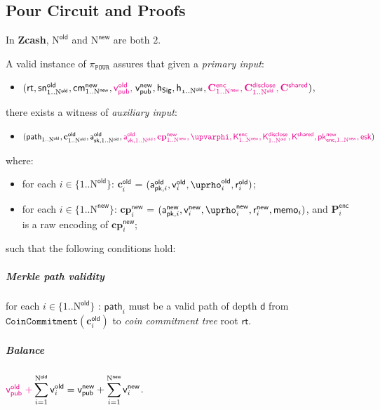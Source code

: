 \documentclass{article}
\newcommand{\changedcolor}{magenta}
\newcommand{\setchanged}{\color{\changedcolor}}
\newcommand{\changed}[1]{{\setchanged{#1}}}
\newcommand{\term}[1]{\textsl{#1}\xspace}
\newcommand{\termbf}[1]{\textbf{#1}\xspace}
\newcommand{\Zcash}{\termbf{Zcash}}
\newcommand{\coinCommitmentTree}{\term{coin commitment tree}}
\newcommand{\AuthPublicOld}[1]{\mathsf{a^{old}_{pk,\mathnormal{#1}}}}
\newcommand{\DiscloseKeyOld}[1]{\mathsf{a^{old}_{vk,\mathnormal{#1}}}}
\newcommand{\AuthPrivateOld}[1]{\mathsf{a^{old}_{sk,\mathnormal{#1}}}}
\newcommand{\AuthPublicNew}[1]{\mathsf{a^{new}_{pk,\mathnormal{#1}}}}
\newcommand{\enc}{\mathsf{enc}}
\newcommand{\disclose}{\mathsf{disclose}}
\newcommand{\shared}{\mathsf{shared}}
\newcommand{\EphemeralPrivate}{\mathsf{esk}}
\newcommand{\TransmitPublicNew}[1]{\mathsf{pk^{new}_{\enc,\mathnormal{#1}}}}
\newcommand{\CoinCommitRandOld}[1]{\mathsf{r^{old}_\mathnormal{#1}}}
\newcommand{\CoinCommitRandNew}[1]{\mathsf{r^{new}_\mathnormal{#1}}}
\newcommand{\CoinAddressRandOld}[1]{\mathsf{\uprho^{old}_\mathnormal{#1}}}
\newcommand{\CoinAddressRandNew}[1]{\mathsf{\uprho^{new}_\mathnormal{#1}}}
\newcommand{\CoinAddressPreRand}{\mathsf{\upvarphi}}
\newcommand{\Memo}{\mathsf{memo}}
\newcommand{\Plaintext}{\mathbf{P}}
\newcommand{\Ciphertext}{\mathbf{C}}
\newcommand{\Key}{\mathsf{K}}
\newcommand{\TransmitPlaintext}[1]{\Plaintext^\enc_{#1}}
\newcommand{\TransmitCiphertext}[1]{\Ciphertext^\enc_{#1}}
\newcommand{\TransmitKey}[1]{\Key^\enc_{#1}}
\newcommand{\DerivedKey}[1]{\Key^\disclose_{#1}}
\newcommand{\DiscloseCiphertext}[1]{\Ciphertext^\disclose_{#1}}
\newcommand{\SharedCiphertext}{\Ciphertext^\shared}
\newcommand{\SharedKey}[1]{\Key^\shared_{#1}}
\newcommand{\cmNew}[1]{\mathsf{{cm}^{new}_\mathnormal{#1}}}
\newcommand{\MerkleDepth}{\mathsf{d}}
\newcommand{\snOld}[1]{\mathsf{{sn}^{old}_\mathnormal{#1}}}
\newcommand{\vsum}[2]{\smashoperator[r]{\sum_{#1}^{#2}}}
\newcommand{\rt}{\mathsf{rt}}
\newcommand{\hSig}{\mathsf{h_{Sig}}}
\newcommand{\h}[1]{\mathsf{h_{\mathnormal{#1}}}}
\newcommand{\NOld}{\mathrm{N}^\mathsf{old}}
\newcommand{\NNew}{\mathrm{N}^\mathsf{new}}
\newcommand{\PourStatement}{\texttt{POUR}}
\newcommand{\PourProof}{\pi_{\PourStatement}}
\newcommand{\vpubOld}{\mathsf{v_{pub}^{old}}}
\newcommand{\vpubNew}{\mathsf{v_{pub}^{new}}}
\newcommand{\cOld}[1]{\mathbf{c}_{#1}^\mathsf{old}}
\newcommand{\cpNew}[1]{\mathbf{cp}_{#1}^\mathsf{new}}
\newcommand{\vOld}[1]{\mathsf{v}_{#1}^\mathsf{old}}
\newcommand{\vNew}[1]{\mathsf{v}_{#1}^\mathsf{new}}
\newcommand{\treepath}[1]{\mathsf{path}_{#1}}
\newcommand{\CoinCommitment}{\mathtt{CoinCommitment}}
\begin{document}
\subsection{Pour Circuit and Proofs}

In \Zcash, $\NOld$ and $\NNew$ are both $2$.

A valid instance of $\PourProof$ assures that given a \term{primary input}:

\begin{itemize}
  \item[] $(\rt, \snOld{\mathrm{1}..\NOld}, \cmNew{\mathrm{1}..\NNew}, \changed{\vpubOld,\;}
\vpubNew, \hSig, \h{1..\NOld}, \changed{\TransmitCiphertext{1..\NNew},
\DiscloseCiphertext{1..\NOld}, \SharedCiphertext})$,
\end{itemize}

there exists a witness of \term{auxiliary input}:

\begin{itemize}
  \item[] $(\treepath{1..\NOld}, \cOld{1..\NOld}, \AuthPrivateOld{\mathrm{1}..\NOld},
\changed{\DiscloseKeyOld{\mathrm{1}..\NOld}, \cpNew{1..\NNew},
\CoinAddressPreRand, \TransmitKey{1..\NNew}, \DerivedKey{1..\NOld}, \SharedKey{},
\TransmitPublicNew{\mathrm{1}..\NNew}, \EphemeralPrivate})$
\end{itemize}

where:

\begin{itemize}
  \item[] for each $i \in \{1..\NOld\}$: $\cOld{i}$ = $(\AuthPublicOld{i},
\vOld{i}, \CoinAddressRandOld{i}, \CoinCommitRandOld{i})$;
  \item[] for each $i \in \{1..\NNew\}$: $\cpNew{i}$ = $(\AuthPublicNew{i},
\vNew{i}, \CoinAddressRandNew{i}, \CoinCommitRandNew{i}, \Memo_i)$,
and $\TransmitPlaintext{i}$ is a raw encoding of $\cpNew{i}$;
\end{itemize}

such that the following conditions hold:

\subparagraph{Merkle path validity}

for each $i \in \{1..\NOld\}$ \changed{$\mid$ $\vOld{i} \neq 0$}:
$\treepath{i}$ must be a valid path of depth $\MerkleDepth$ from \linebreak
$\CoinCommitment(\cOld{i})$ to \coinCommitmentTree root $\rt$.

\subparagraph{Balance}

$\changed{\vpubOld\; +} \vsum{i=1}{\NOld} \vOld{i} = \vpubNew + \vsum{i=1}{\NNew} \vNew{i}$.
\end{document}
